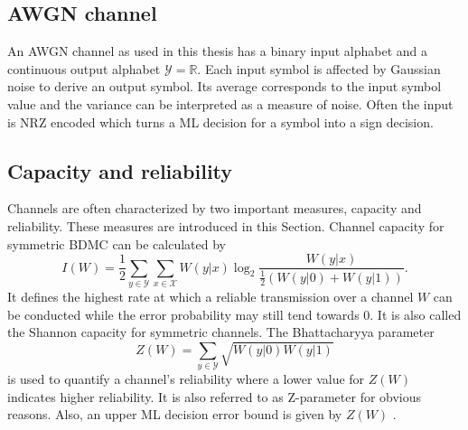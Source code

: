 \subsection{AWGN channel}
An \ac{AWGN} channel as used in this thesis has a binary input alphabet and a continuous output alphabet $\mathcal{Y} = \mathbb{R}$.
Each input symbol is affected by Gaussian noise to derive an output symbol.
Its average corresponds to the input symbol value and the variance can be interpreted as a measure of noise.
Often the input is \ac{NRZ} encoded which turns a \ac{ML} decision for a symbol into a sign decision.

\subsection{Capacity and reliability}
Channels are often characterized by two important measures, capacity and reliability.
These measures are introduced in this Section.
Channel capacity for symmetric \ac{BDMC} can be calculated by
\begin{equation}
 I(W) = \frac{1}{2} \sum_{y \in \mathcal{Y}} \sum_{x \in \mathcal{X}} W(y|x) \log_2 \frac{W(y|x)}{\frac{1}{2} (W(y|0) + W(y|1))}.
\end{equation}
It defines the highest rate at which a reliable transmission over a channel $W$ can be conducted while the error probability may still tend towards $0$.
It is also called the Shannon capacity \cite{sha49} for symmetric channels.
The Bhattacharyya parameter
\begin{equation}
 Z(W) = \sum_{y \in \mathcal{Y}} \sqrt{W(y|0) W(y|1)}
\end{equation}
is used to quantify a channel's reliability where a lower value for $Z(W)$ indicates higher reliability.
It is also referred to as Z-parameter for obvious reasons.
Also, an upper \ac{ML} decision error bound is given by $Z(W)$ \cite{polar:arikan09}.

